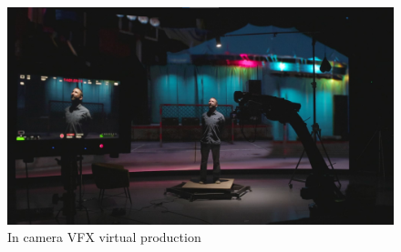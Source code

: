 \begin{figure}
  \centering
   \includegraphics{vprobot}
 \caption{In camera VFX virtual production}
    \label{fig:vprobot}
\end{figure}

